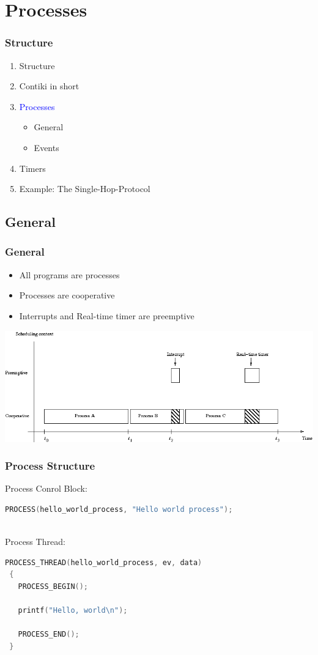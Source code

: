 \documentclass{beamer}
\begin{document}
\section{Processes}
\begin{frame}
\frametitle{Structure}
\begin{enumerate}
\item Structure
\item Contiki in short
\item \textcolor{blue}{Processes}
\begin{itemize}
\item General
\item Events
\end{itemize}
\item Timers
\item Example: The Single-Hop-Protocol
\end{enumerate}
\end{frame}

\subsection*{General}
\begin{frame}
\frametitle{General}
\begin{itemize}
\item All programs are processes
\item Processes are cooperative
\item Interrupts and Real-time timer are preemptive
\end{itemize}
\includegraphics[scale=0.45]{Execution-contexts.png}
\end{frame}

\begin{frame}[fragile]
\frametitle{Process Structure}
Process Conrol Block:
\begin{lstlisting}[language=C, frame=single, basicstyle=\scriptsize]
 PROCESS(hello_world_process, "Hello world process");
\end{lstlisting}
\ \\
Process Thread:
\begin{lstlisting}[language=C, frame=single, basicstyle=\scriptsize]
 PROCESS_THREAD(hello_world_process, ev, data)
 {
   PROCESS_BEGIN();
 
   printf("Hello, world\n");
 
   PROCESS_END();
 }
 \end{lstlisting}
\end{frame}
\end{document}
